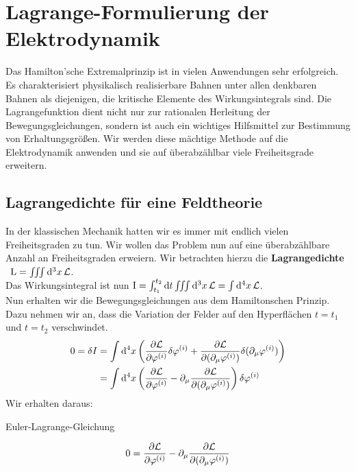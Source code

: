 \section{Lagrange-Formulierung der Elektrodynamik}
Das Hamilton'sche Extremalprinzip ist in vielen Anwendungen sehr erfolgreich. Es charakterisiert physikalisch realisierbare Bahnen unter allen denkbaren Bahnen als diejenigen, die kritische Elemente des Wirkungsintegrals sind. Die Lagrangefunktion dient nicht nur zur rationalen Herleitung der Bewegungsgleichungen, sondern ist auch ein wichtiges Hilfsmittel zur Bestimmung von Erhaltungsgrößen.
Wir werden diese mächtige Methode auf die Elektrodynamik anwenden und sie auf überabzählbar viele Freiheitsgrade erweitern.
\subsection{Lagrangedichte für eine Feldtheorie}
In der klassischen Mechanik hatten wir es immer mit endlich vielen Freiheitsgraden zu tun. Wir wollen das Problem nun auf eine überabzählbare Anzahl an Freiheitsgraden erweiern. Wir betrachten hierzu die \textbf{Lagrangedichte} \  $\text{L}=\iiint \dd[3]{x}  \mathcal{L}$. \\
Das Wirkungsintegral ist nun $\text{I}=\int_{t_1}^{t_2} \dd{t} \iiint \dd[3]{x}  \mathcal{L} = \int \dd[4]{x} \mathcal{L}$. \\
Nun erhalten wir die Bewegungsgleichungen aus dem Hamiltonschen Prinzip. Dazu nehmen wir an, dass die Variation der Felder auf den Hyperflächen $t=t_1$ und $t=t_2$ verschwindet.
\begin{align*}
0 = \delta I &= \int \dd[4]{x} \left( \frac{\partial\mathcal{L}}{\partial\varphi^{(i)}} \delta\varphi^{(i)} + \frac{\partial\mathcal{L}}{\partial(\partial_{\mu}\varphi^{(i)})} \delta(\partial_{\mu}\varphi^{(i)}) \right) \\
 				 &= \int \dd[4]{x} \left(\frac{\partial\mathcal{L}}{\partial\varphi^{(i)}} - \partial_{\mu} \frac{\partial\mathcal{L}}{\partial(\partial_{\mu}\varphi^{(i)})} \right) \delta\varphi^{(i)}
\end{align*}
Wir erhalten daraus:
\begin{mybox}{Euler-Lagrange-Gleichung}

\begin{align}
0=\frac{\partial\mathcal{L}}{\partial\varphi^{(i)}} - \partial_{\mu} \frac{\partial\mathcal{L}}{\partial(\partial_{\mu}\varphi^{(i)})}
\end{align}

\end{mybox}

